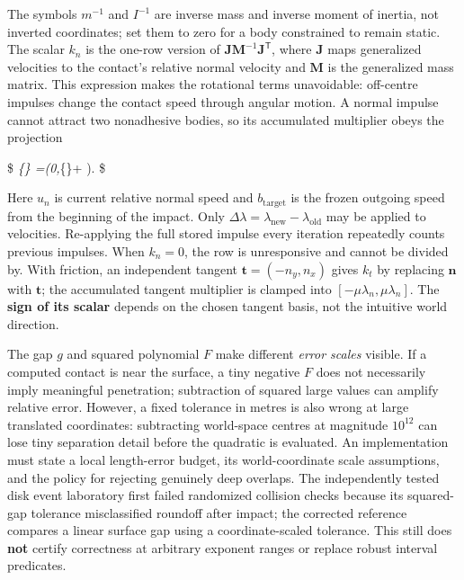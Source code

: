 The symbols \(m^{-1}\) and \(I^{-1}\) are inverse mass and inverse moment of inertia, not inverted coordinates; set them to zero for a body constrained to remain static. The scalar \(k_n\) is the one-row version of \(\mathbf J\mathbf M^{-1}\mathbf J^\mathsf T\), where \(\mathbf J\) maps generalized velocities to the contact's relative normal velocity and \(\mathbf M\) is the generalized mass matrix. This expression makes the rotational terms unavoidable: off-centre impulses change the contact speed through angular motion. A normal impulse cannot attract two nonadhesive bodies, so its accumulated multiplier obeys the projection

\$ \lambda\emph{\{\} =\max\left(0,\lambda}\{\}+ \right). \$

Here \(u_n\) is current relative normal speed and \(b_{\mathrm{target}}\) is the frozen outgoing speed from the beginning of the impact. Only \(\Delta\lambda=\lambda_{\mathrm{new}}-\lambda_{\mathrm{old}}\) may be applied to velocities. Re-applying the full stored impulse every iteration repeatedly counts previous impulses. When \(k_n=0\), the row is unresponsive and cannot be divided by. With friction, an independent tangent \(\mathbf t=(-n_y,n_x)\) gives \(k_t\) by replacing \(\mathbf n\) with \(\mathbf t\); the accumulated tangent multiplier is clamped into \([-\mu\lambda_n,\mu\lambda_n]\). The \textbf{sign of its scalar} depends on the chosen tangent basis, not the intuitive world direction.

The gap \(g\) and squared polynomial \(F\) make different \emph{error scales} visible. If a computed contact is near the surface, a tiny negative \(F\) does not necessarily imply meaningful penetration; subtraction of squared large values can amplify relative error. However, a fixed tolerance in metres is also wrong at large translated coordinates: subtracting world-space centres at magnitude \(10^{12}\) can lose tiny separation detail before the quadratic is evaluated. An implementation must state a local length-error budget, its world-coordinate scale assumptions, and the policy for rejecting genuinely deep overlaps. The independently tested disk event laboratory first failed randomized collision checks because its squared-gap tolerance misclassified roundoff after impact; the corrected reference compares a linear surface gap using a coordinate-scaled tolerance. This still does \textbf{not} certify correctness at arbitrary exponent ranges or replace robust interval predicates.

